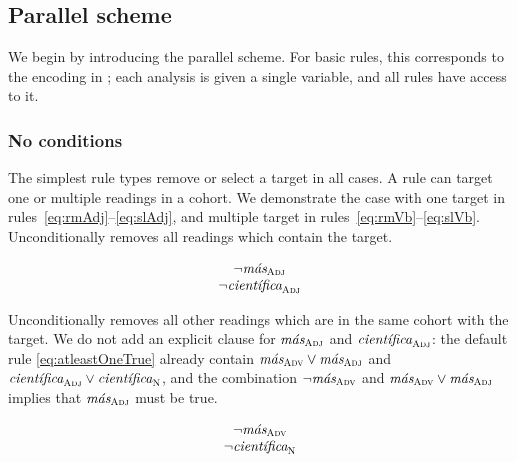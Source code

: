 
\subsection{Parallel scheme}

We begin by introducing the parallel scheme. For basic rules, this corresponds to the encoding in \cite{lager98}; each analysis is given a single variable, and all rules have access to it.

\subsubsection{No conditions} 

The simplest rule types remove or select a target in all cases. 
A rule can target one or multiple readings in a cohort. We demonstrate the case with one target in rules~\ref{eq:rmAdj}--\ref{eq:slAdj}, and multiple target in rules~\ref{eq:rmVb}--\ref{eq:slVb}. \\


 Unconditionally removes all readings which contain the target.

\begin{equation}
\begin{array}{c}
\neg{}\masAdj \\
\neg{}\cientificaAdj
\end{array}
\label{eq:rmAdj}
\end{equation}

 Unconditionally removes all other readings which are in the same cohort with the target.
We do not add an explicit clause for $\text{\em m\'{a}s}_{\text{\sc Adj}}$ and $\cientificaAdj$: the default rule \ref{eq:atleastOneTrue} already contain $\text{\em m\'{a}s}_{\text{\sc Adv}} \vee \text{\em m\'{a}s}_{\text{\sc Adj}}$ and $\cientificaAdj \vee \cientificaN$, and the combination $\neg\text{\em m\'{a}s}_{\text{\sc Adv}}$  and $\text{\em m\'{a}s}_{\text{\sc Adv}} \vee \text{\em m\'{a}s}_{\text{\sc Adj}}$  implies that $\text{\em m\'{a}s}_{\text{\sc Adj}}$ must be true. 

\begin{equation}
\begin{array}{c}
\neg{}\masAdv \\
\neg{}\cientificaN
\end{array}
\label{eq:slAdj}
\end{equation}

